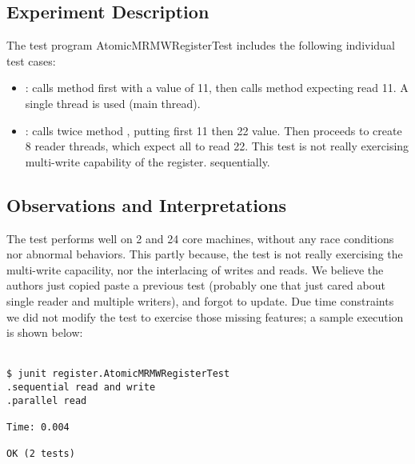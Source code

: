 \subsection{Experiment Description}
The test program AtomicMRMWRegisterTest includes the following individual
test cases: 

\begin{itemize}
  \item {}: calls  method first with a value
    of 11, then calls  method expecting read 11. A single
    thread is used (main thread).
  \item {}: calls twice method , putting first
    11 then 22 value. Then proceeds to create 8 reader threads, which
    expect all to read 22. This test is not really exercising
    multi-write capability of the register.
    sequentially.
\end{itemize}

\subsection{Observations and Interpretations}
The test performs well on 2 and 24 core machines, without any race
conditions nor abnormal behaviors. This partly because, the test is
not really exercising the multi-write capacility, nor the interlacing
of writes and reads. We believe the authors just copied paste a
previous test (probably one that just cared about single reader and
multiple writers), and forgot to update. Due time constraints we did
not modify the test to exercise those missing features; a sample
execution is shown below: \\\\

\begin{verbatim}
$ junit register.AtomicMRMWRegisterTest
.sequential read and write
.parallel read

Time: 0.004

OK (2 tests)
\end{verbatim}
\hfill
